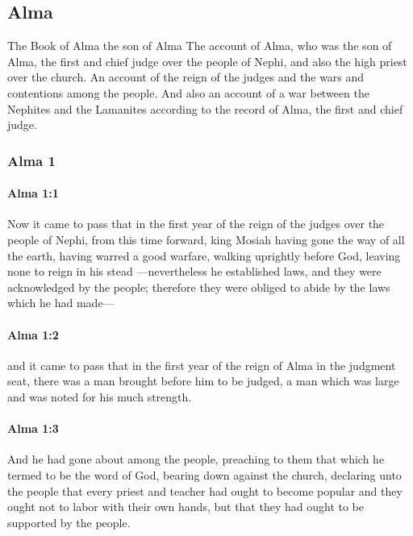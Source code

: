 \subsection{Alma}
	\label{ALMA}
	
	The Book of Alma
	the son of Alma
	The account of Alma, who was the son of Alma,
	the first and chief judge over the people of Nephi,
	and also the high priest over the church.
	An account of the reign of the judges
	and the wars and contentions among the people.
	And also an account of a war between the Nephites and the Lamanites
	according to the record of Alma, the first and chief judge.

	\subsubsection{Alma 1} %
		\label{ALMA-1}
		
		\paragraph{Alma 1:1} %
			\label{ALMA-1-1}

			Now it came to pass that
			in the first year of the reign of the judges over the people of Nephi,
			from this time forward,
			king Mosiah having gone the way of all the earth,
			having warred a good warfare,
			walking uprightly before God,
			leaving none to reign in his stead
			---nevertheless he established laws,
			and they were acknowledged by the people;
			therefore they were obliged to abide by the laws which he had made---

		\paragraph{Alma 1:2} %
			\label{ALMA-1-2}

			and it came to pass that
			in the first year of the reign of Alma in the judgment seat,
			there was a man brought before him to be judged,
			a man which was large and was noted for his much strength.

		\paragraph{Alma 1:3} %
			\label{ALMA-1-3}

			And he had gone about among the people,
			preaching to them that which he termed to be the word of God,
			bearing down against the church,
			declaring unto the people
			that every priest and teacher had ought to become popular
			and they ought not to labor with their own hands,
			but that they had ought to be supported by the people.

